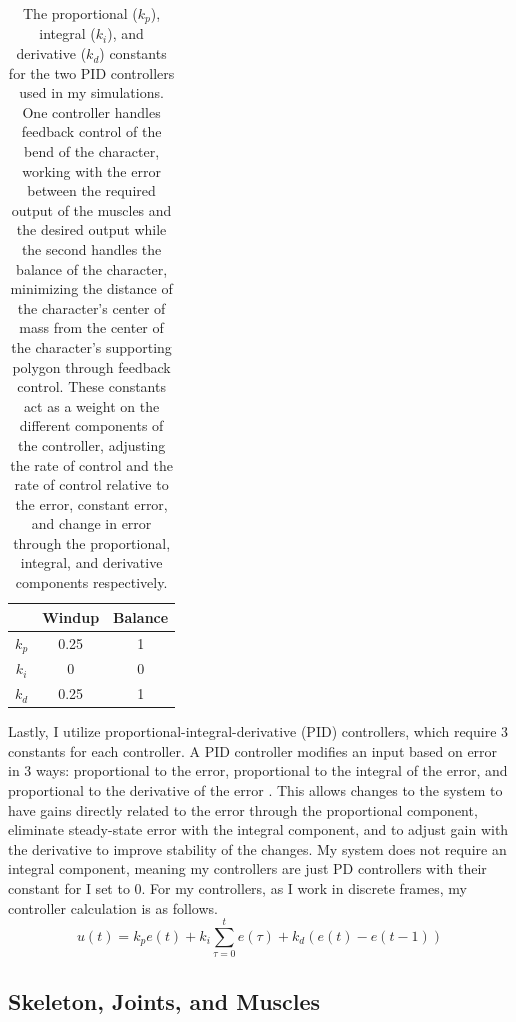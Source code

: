 \begin{table}[ht]
	\centering
	\caption[PID controller constants for my simulation]{The proportional ($k_p$), integral ($k_i$), and derivative ($k_d$) constants for the two PID controllers used in my simulations.  One controller handles feedback control of the bend of the character, working with the error between the required output of the muscles and the desired output while the second handles the balance of the character, minimizing the distance of the character's center of mass from the center of the character's supporting polygon through feedback control.  These constants act as a weight on the different components of the controller, adjusting the rate of control and the rate of control relative to the error, constant error, and change in error through the proportional, integral, and derivative components respectively.}
	\begin{tabular}{|c|c|c|}
		\hline
		& Windup & Balance \\ \hline
		$k_p$ & 0.25 & 1 \\ \hline
		$k_i$ & 0 & 0 \\ \hline
		$k_d$ & 0.25 & 1 \\ \hline
	\end{tabular}
	\label{tab:pd_constants}
\end{table}

Lastly, I utilize proportional-integral-derivative (PID) controllers, which require 3 constants for each controller.  A PID controller modifies an input based on error in 3 ways: proportional to the error, proportional to the integral of the error, and proportional to the derivative of the error \cite{pid}.  This allows changes to the system to have gains directly related to the error through the proportional component, eliminate steady-state error with the integral component, and to adjust gain with the derivative to improve stability of the changes.  My system does not require an integral component, meaning my controllers are just PD controllers with their constant for I set to 0.  For my controllers, as I work in discrete frames, my controller calculation is as follows.
\[
	u(t) = k_p e(t) + k_i \displaystyle\sum_{\tau = 0}^t e(\tau) + k_d \left( e(t) - e(t-1) \right)
\]


\subsection{Skeleton, Joints, and Muscles}
\label{subsection:skel_joints}

